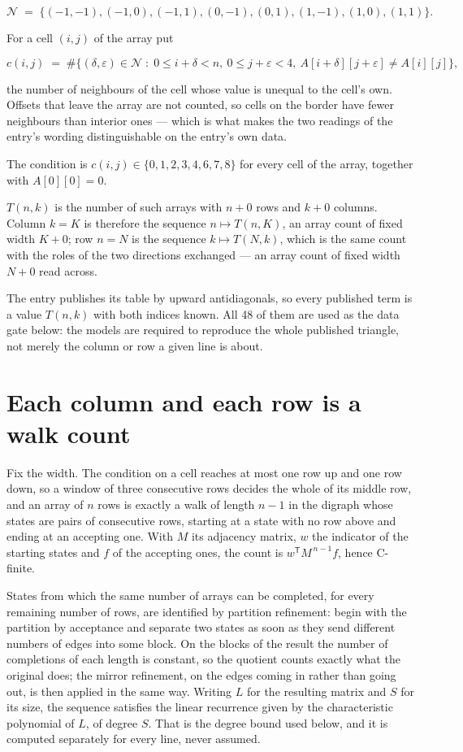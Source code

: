 \documentclass[11pt]{article}
\theoremstyle{definition}
\begin{document}
\[\mathcal{N} \;=\; \{(-1,-1), (-1,0), (-1,1), (0,-1), (0,1), (1,-1), (1,0), (1,1)\}.\]

For a cell $(i,j)$ of the array put

\[c(i,j) \;=\; \#\bigl\{(\delta,\varepsilon)\in\mathcal{N} \;:\; 0\le i+\delta<n,\ 0\le j+\varepsilon<4,\ A[i+\delta][j+\varepsilon] \neq A[i][j]\bigr\},\]

the number of neighbours of the cell whose value is unequal to the cell's own. Offsets that leave the array are not counted, so cells on the border have fewer neighbours than interior ones --- which is what makes the two readings of the entry's wording distinguishable on the entry's own data.

The condition is $c(i,j) \in \{0, 1, 2, 3, 4, 6, 7, 8\}$ for every cell of the array, together with $A[0][0]=0$.

$T(n,k)$ is the number of such arrays with $n + 0$ rows and $k + 0$ columns. Column $k = K$ is therefore the sequence $n \mapsto T(n,K)$, an array count of fixed width $K + 0$; row $n = N$ is the sequence $k \mapsto T(N,k)$, which is the same count with the roles of the two directions exchanged --- an array count of fixed width $N + 0$ read across.

The entry publishes its table by upward antidiagonals, so every published term is a value $T(n,k)$ with both indices known. All 48 of them are used as the data gate below: the models are required to reproduce the whole published triangle, not merely the column or row a given line is about.

\section{Each column and each row is a walk count}

Fix the width. The condition on a cell reaches at most one row up and one row down, so a window of three consecutive rows decides the whole of its middle row, and an array of $n$ rows is exactly a walk of length $n-1$ in the digraph whose states are pairs of consecutive rows, starting at a state with no row above and ending at an accepting one. With $M$ its adjacency matrix, $w$ the indicator of the starting states and $f$ of the accepting ones, the count is $w^{\mathsf T}M^{\,n-1}f$, hence C-finite.

States from which the same number of arrays can be completed, for every remaining number of rows, are identified by partition refinement: begin with the partition by acceptance and separate two states as soon as they send different numbers of edges into some block. On the blocks of the result the number of completions of each length is constant, so the quotient counts exactly what the original does; the mirror refinement, on the edges coming in rather than going out, is then applied in the same way. Writing $L$ for the resulting matrix and $S$ for its size, the sequence satisfies the linear recurrence given by the characteristic polynomial of $L$, of degree $S$. That is the degree bound used below, and it is computed separately for every line, never assumed.
\end{document}
